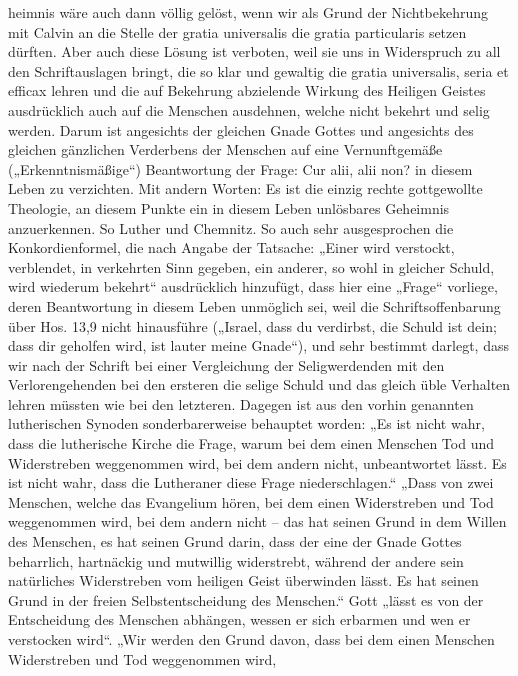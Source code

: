 heimnis wäre auch dann völlig gelöst, wenn wir als Grund der Nichtbekehrung mit Calvin an die Stelle der gratia universalis die gratia particularis setzen dürften. Aber auch diese Lösung ist verboten, weil sie uns in Widerspruch zu all den Schriftauslagen bringt, die so klar und gewaltig die gratia universalis, seria et efficax lehren und die auf Bekehrung abzielende Wirkung des Heiligen Geistes ausdrücklich auch auf die Menschen ausdehnen, welche nicht bekehrt und selig werden. Darum ist angesichts der gleichen Gnade Gottes und angesichts des gleichen gänzlichen Verderbens der Menschen auf eine Vernunftgemäße („Erkenntnismäßige“) Beantwortung der Frage: Cur alii, alii non? in diesem Leben zu verzichten. Mit andern Worten: Es ist die einzig rechte gottgewollte Theologie, an diesem Punkte ein in diesem Leben unlösbares Geheimnis anzuerkennen. So Luther und Chemnitz. So auch sehr ausgesprochen die Konkordienformel, die nach Angabe der Tatsache: „Einer wird verstockt, verblendet, in verkehrten Sinn gegeben, ein anderer, so wohl in gleicher Schuld, wird wiederum bekehrt“ ausdrücklich hinzufügt, dass hier eine „Frage“ vorliege, deren Beantwortung in diesem Leben unmöglich sei, weil die Schriftsoffenbarung über Hos. 13,9 nicht hinausführe („Israel, dass du verdirbst, die Schuld ist dein; dass dir geholfen wird, ist lauter meine Gnade“), und sehr bestimmt darlegt, dass wir nach der Schrift bei einer Vergleichung der Seligwerdenden mit den Verlorengehenden bei den ersteren die selige Schuld und das gleich üble Verhalten lehren müssten wie bei den letzteren. Dagegen ist aus den vorhin genannten lutherischen Synoden sonderbarerweise behauptet worden: „Es ist nicht wahr, dass die lutherische Kirche die Frage, warum bei dem einen Menschen Tod und Widerstreben weggenommen wird, bei dem andern nicht, unbeantwortet lässt. Es ist nicht wahr, dass die Lutheraner diese Frage niederschlagen.“ „Dass von zwei Menschen, welche das Evangelium hören, bei dem einen Widerstreben und Tod weggenommen wird, bei dem andern nicht – das hat seinen Grund in dem Willen des Menschen, es hat seinen Grund darin, dass der eine der Gnade Gottes beharrlich, hartnäckig und mutwillig widerstrebt, während der andere sein natürliches Widerstreben vom heiligen Geist überwinden lässt. Es hat seinen Grund in der freien Selbstentscheidung des Menschen.“ Gott „lässt es von der Entscheidung des Menschen abhängen, wessen er sich erbarmen und wen er verstocken wird“. „Wir werden den Grund davon, dass bei dem einen Menschen Widerstreben und Tod weggenommen wird,